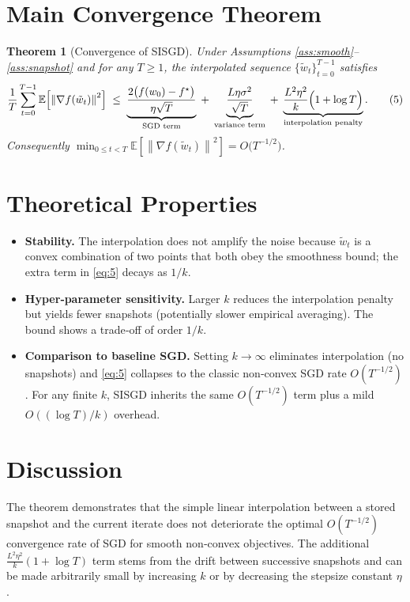 \documentclass{article}
\newtheorem{theorem}{Theorem}
\newcommand{\E}{\mathbb{E}}
\newcommand{\norm}[1]{\left\lVert #1\right\rVert}
\begin{document}
\section*{Main Convergence Theorem}
\begin{theorem}[Convergence of SISGD]\label{thm:main}
Under Assumptions \ref{ass:smooth}–\ref{ass:snapshot} and for any $T\ge1$, the interpolated sequence $\{\tilde w_t\}_{t=0}^{T-1}$ satisfies
\[
\frac{1}{T}\sum_{t=0}^{T-1}\E\!\left[\norm{\nabla f(\tilde w_t)}^2\right]
\;\le\;
\underbrace{\frac{2\bigl(f(w_0)-f^\star\bigr)}{\eta\sqrt{T}}}_{\text{SGD term}}
\;+\;
\underbrace{\frac{L\eta\sigma^2}{\sqrt{T}}}_{\text{variance term}}
\;+\;
\underbrace{\frac{L^2\eta^2}{k}\Bigl(1+\log T\Bigr)}_{\text{interpolation penalty}} .
\tag{5}
\]
Consequently $\displaystyle \min_{0\le t<T}\E\!\left[\norm{\nabla f(\tilde w_t)}^2\right]=O\!\bigl(T^{-1/2}\bigr)$.
\end{theorem}

\section*{Theoretical Properties}
\begin{itemize}[leftmargin=*]
\item \textbf{Stability.} The interpolation does not amplify the noise because $\tilde w_t$ is a convex combination of two points that both obey the smoothness bound; the extra term in \eqref{eq:5} decays as $1/k$.
\item \textbf{Hyper‑parameter sensitivity.} Larger $k$ reduces the interpolation penalty but yields fewer snapshots (potentially slower empirical averaging). The bound shows a trade‑off of order $1/k$.
\item \textbf{Comparison to baseline SGD.} Setting $k\to\infty$ eliminates interpolation (no snapshots) and \eqref{eq:5} collapses to the classic non‑convex SGD rate $O(T^{-1/2})$. For any finite $k$, SISGD inherits the same $O(T^{-1/2})$ term plus a mild $O((\log T)/k)$ overhead.
\end{itemize}

\section*{Discussion}
The theorem demonstrates that the simple linear interpolation between a stored snapshot and the current iterate does not deteriorate the optimal $O(T^{-1/2})$ convergence rate of SGD for smooth non‑convex objectives. The additional $\frac{L^2\eta^2}{k}(1+\log T)$ term stems from the drift between successive snapshots and can be made arbitrarily small by increasing $k$ or by decreasing the stepsize constant $\eta$.
\end{document}
